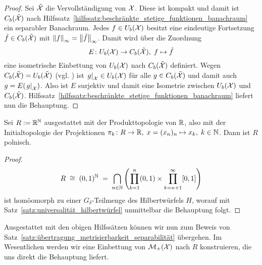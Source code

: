 \documentclass[../thesis/thesis.tex]{subfiles}
\begin{document}
	\begin{proof}
		Sei $\tilde{\mathcal{X}}$ die Vervollständigung von $\mathcal{X}$. Diese ist kompakt und damit ist $C_b(\tilde{\mathcal{X}})$ nach Hilfssatz~\ref{hilfssatz:beschränkte_stetige_funktionen_banachraum} ein separabler Banachraum.
		Jedes $f \in U_b(\mathcal{X})$ besitzt eine eindeutige Fortsetzung $\tilde{f} \in C_b(\tilde{\mathcal{X}})$ mit $\left\lVert f\right\rVert_\infty = \left\lVert\tilde{f}\right\rVert_\infty$. Damit wird über die Zuordnung
		\[ E \colon U_b(\mathcal{X}) \to C_b(\tilde{\mathcal{X}}), \; f \mapsto \tilde{f}  \]
		eine isometrische Einbettung von $U_b(\mathcal{X})$ nach $C_b(\tilde{\mathcal{X}})$ definiert. 
		Wegen $C_b(\tilde{\mathcal{X}}) = U_b(\tilde{\mathcal{X}})$ (vgl. \cite[Satz 2.4.1]{Simon.2015}) ist $\left.g\right|_{\mathcal{X}} \in U_b(\mathcal{X})$ für alle $g \in C_b(\tilde{\mathcal{X}})$ und damit
		auch $g = E(\left.g\right|_{\mathcal{X}})$. Also ist $E$ surjektiv und damit eine Isometrie zwischen $U_b(\mathcal{X})$ und $C_b(\tilde{\mathcal{X}})$. Hilfssatz~\ref{hilfssatz:beschränkte_stetige_funktionen_banachraum} liefert nun die Behauptung.
	\end{proof}
	
	\begin{Hilfssatz}
		\label{hilfssatz:einbettungsraum_R}
		Sei $R \vcentcolon = \mathbb{R}^{\mathbb{N}}$ ausgestattet mit der Produkttopologie von $\mathbb{R}$, also mit der Initialtopologie der Projektionen $\pi_k \colon R \to \mathbb{R}, \; x = (x_n)_n \mapsto x_k , \; k \in \mathbb{N}$. Dann ist $R$ 
		polnisch.
	\end{Hilfssatz}
	
	\begin{proof}
		\[R \; \cong \; (0, 1)^{\mathbb{N}} \; = \; \bigcap_{n \in \mathbb{N}}  \left( \prod_{k=1}^{n} (0, 1) \times \prod_{k=n+1}^{\infty} [0,1] \right) \]
		ist homöomorph zu einer $G_\delta$-Teilmenge des Hilbertwürfels $H$, worauf mit Satz~\ref{satz:universalität_hilbertwürfel} unmittelbar die Behauptung folgt.
	\end{proof}

	Ausgestattet mit den obigen Hilfssätzen können wir nun zum Beweis von Satz~\ref{satz:übertragung_metrisierbarkeit_separabilität} übergehen. Im Wesentlichen werden wir eine Einbettung von $\mathcal{M}_{+}(\mathcal{X})$ nach $R$ konstruieren, die uns direkt die Behauptung liefert.
	
\end{document}
